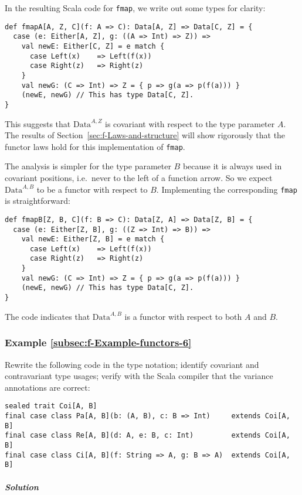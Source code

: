 In the resulting Scala code for \lstinline!fmap!, we write out some
types for clarity:
\begin{lstlisting}
def fmapA[A, Z, C](f: A => C): Data[A, Z] => Data[C, Z] = {
  case (e: Either[A, Z], g: ((A => Int) => Z)) =>
    val newE: Either[C, Z] = e match {
      case Left(x)    => Left(f(x))
      case Right(z)   => Right(z)
    }
    val newG: (C => Int) => Z = { p => g(a => p(f(a))) }
    (newE, newG) // This has type Data[C, Z].
}
\end{lstlisting}
This suggests that $\text{Data}^{A,Z}$ is covariant with respect
to the type parameter $A$. The results of Section~\ref{sec:f-Laws-and-structure}
will show rigorously that the functor laws hold for this implementation
of \lstinline!fmap!.

The analysis is simpler for the type parameter $B$ because it is
always used in covariant positions, i.e.~never to the left of a function
arrow. So we expect $\text{Data}^{A,B}$ to be a functor with respect
to $B$. Implementing the corresponding \lstinline!fmap! is straightforward:
\begin{lstlisting}
def fmapB[Z, B, C](f: B => C): Data[Z, A] => Data[Z, B] = {
  case (e: Either[Z, B], g: ((Z => Int) => B)) =>
    val newE: Either[Z, B] = e match {
      case Left(x)    => Left(f(x))
      case Right(z)   => Right(z)
    }
    val newG: (C => Int) => Z = { p => g(a => p(f(a))) }
    (newE, newG) // This has type Data[C, Z].
}
\end{lstlisting}

The code indicates that $\text{Data}^{A,B}$ is a functor with respect
to both $A$ and $B$.

\subsubsection{Example \label{subsec:f-Example-functors-6}\ref{subsec:f-Example-functors-6}}

Rewrite the following code in the type notation; identify covariant
and contravariant type usages; verify with the Scala compiler that
the variance annotations are correct:
\begin{lstlisting}
sealed trait Coi[A, B]
final case class Pa[A, B](b: (A, B), c: B => Int)     extends Coi[A, B]
final case class Re[A, B](d: A, e: B, c: Int)         extends Coi[A, B]
final case class Ci[A, B](f: String => A, g: B => A)  extends Coi[A, B]
\end{lstlisting}


\subparagraph{Solution}

